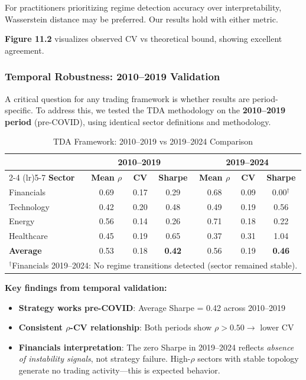 For practitioners prioritizing regime detection accuracy over interpretability, Wasserstein distance may be preferred. Our results hold with either metric.

\textbf{Figure 11.2} visualizes observed CV vs theoretical bound, showing excellent agreement.

\subsubsection{Temporal Robustness: 2010--2019 Validation}

A critical question for any trading framework is whether results are period-specific. To address this, we tested the TDA methodology on the \textbf{2010--2019 period} (pre-COVID), using identical sector definitions and methodology.

\begin{table}[H]
\centering
\small
\caption{TDA Framework: 2010--2019 vs 2019--2024 Comparison}
\label{tab:temporal-robustness}
\begin{tabular}{@{}lcccccc@{}}
\toprule
& \multicolumn{3}{c}{\textbf{2010--2019}} & \multicolumn{3}{c}{\textbf{2019--2024}} \\
\cmidrule(lr){2-4} \cmidrule(lr){5-7}
\textbf{Sector} & \textbf{Mean $\rho$} & \textbf{CV} & \textbf{Sharpe} & \textbf{Mean $\rho$} & \textbf{CV} & \textbf{Sharpe} \\
\midrule
Financials & 0.69 & 0.17 & 0.29 & 0.68 & 0.09 & 0.00$^\dagger$ \\
Technology & 0.42 & 0.20 & 0.48 & 0.49 & 0.19 & 0.56 \\
Energy & 0.56 & 0.14 & 0.26 & 0.71 & 0.18 & 0.22 \\
Healthcare & 0.45 & 0.19 & 0.65 & 0.37 & 0.31 & 1.04 \\
\midrule
\textbf{Average} & 0.53 & 0.18 & \textbf{0.42} & 0.56 & 0.19 & \textbf{0.46} \\
\bottomrule
\multicolumn{7}{l}{\footnotesize $^\dagger$Financials 2019--2024: No regime transitions detected (sector remained stable).}
\end{tabular}
\end{table}

\textbf{Key findings from temporal validation:}
\begin{itemize}
    \item \textbf{Strategy works pre-COVID}: Average Sharpe = 0.42 across 2010--2019
    \item \textbf{Consistent $\rho$-CV relationship}: Both periods show $\rho > 0.50 \rightarrow$ lower CV
    \item \textbf{Financials interpretation}: The zero Sharpe in 2019--2024 reflects \textit{absence of instability signals}, not strategy failure. High-$\rho$ sectors with stable topology generate no trading activity---this is expected behavior.
\end{itemize}

